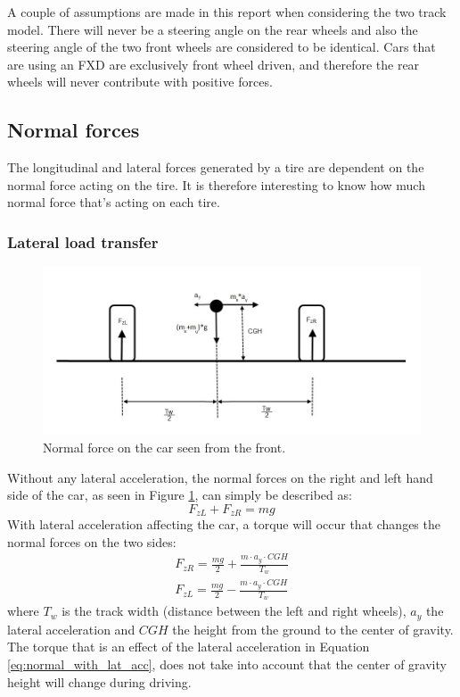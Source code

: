 A couple of assumptions are made in this report when considering the two track model. There will never be a steering angle on the rear wheels and also the steering angle of the two front wheels are considered to be identical. Cars that are using an FXD are exclusively front wheel driven, and therefore the rear wheels will never contribute with positive forces. 



\subsection{Normal forces}
\label{normal_force}
The longitudinal and lateral forces generated by a tire are dependent on the normal force acting on the tire. It is therefore interesting to know how much normal force that's acting on each tire.
\subsubsection{Lateral load transfer}
\begin{figure}[h]
	\centering
	\includegraphics[width=1\textwidth]{Pictures/normal_force_lateral}
	\caption{Normal force on the car seen from the front.}
	\label{normal_force_lateral}
\end{figure}
Without any lateral acceleration, the normal forces on the right and left hand side of the car, as seen in Figure  \ref{normal_force_lateral}, can simply be described as:
\begin{equation} \label{eq:normal}
	F_{zL} + F_{zR} = mg
\end{equation}
With lateral acceleration affecting the car, a torque will occur that changes the normal forces on the two sides: 
\begin{equation} \label{eq:normal_with_lat_acc}
\begin{split}
	F_{zR} = \frac{mg}{2} + \frac{m\cdot a_{y}\cdot CGH}{T_{w}} \\
	F_{zL} = \frac{mg}{2} - \frac{m\cdot a_{y}\cdot CGH}{T_{w}}
\end{split}
\end{equation}
where $ T_{w} $ is the track width (distance between the left and right wheels), $ a_{y} $ the lateral acceleration and $ CGH $ the height from the ground to the center of gravity. The torque that is an effect of the lateral acceleration in Equation \ref{eq:normal_with_lat_acc}, does not take into account that the center of gravity height will change during driving.

